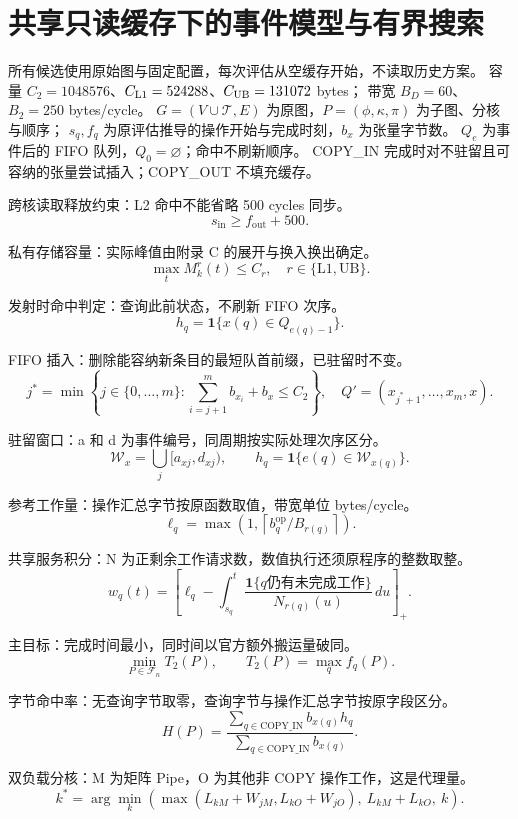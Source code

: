 \section{共享只读缓存下的事件模型与有界搜索}
所有候选使用原始图与固定配置，每次评估从空缓存开始，不读取历史方案。
容量 $C_2=1048576$、$C_{\rm L1}=524288$、$C_{\rm UB}=131072$ bytes；
带宽 $B_D=60$、$B_2=250$ bytes/cycle。
$G=(V\cup\mathcal T,E)$ 为原图，$P=(\phi,\kappa,\pi)$ 为子图、分核与顺序；
$s_q,f_q$ 为原评估推导的操作开始与完成时刻，$b_x$ 为张量字节数。
$Q_e$ 为事件后的 FIFO 队列，$Q_0=\varnothing$；命中不刷新顺序。
COPY\_IN 完成时对不驻留且可容纳的张量尝试插入；COPY\_OUT 不填充缓存。

跨核读取释放约束：L2 命中不能省略 500 cycles 同步。
\[
s_{\mathrm{in}}\ge f_{\mathrm{out}}+500. \tag{1}
\]

私有存储容量：实际峰值由附录 C 的展开与换入换出确定。
\[
\max_t M_k^r(t)\le C_r,\quad r\in\{\mathrm{L1},\mathrm{UB}\}. \tag{2}
\]

发射时命中判定：查询此前状态，不刷新 FIFO 次序。
\[
h_q=\mathbf1\{x(q)\in Q_{e(q)-1}\}. \tag{3}
\]

FIFO 插入：删除能容纳新条目的最短队首前缀，已驻留时不变。
\[
j^*=\min\left\{j\in\{0,\ldots,m\}:\sum_{i=j+1}^{m}b_{x_i}+b_x\le C_2\right\},
\quad Q'=(x_{j^*+1},\ldots,x_m,x). \tag{4}
\]

驻留窗口：a 和 d 为事件编号，同周期按实际处理次序区分。
\[
\mathcal W_x=\bigcup_j[a_{xj},d_{xj}),\qquad
h_q=\mathbf1\{e(q)\in\mathcal W_{x(q)}\}. \tag{5}
\]

参考工作量：操作汇总字节按原函数取值，带宽单位 bytes/cycle。
\[
\ell_q=\max\left(1,\left\lceil b_q^{\mathrm{op}}/B_{r(q)}\right\rceil\right).
\tag{6}
\]

共享服务积分：N 为正剩余工作请求数，数值执行还须原程序的整数取整。
\[
w_q(t)=\left[\ell_q-\int_{s_q}^{t}
\frac{\mathbf1\{q\text{仍有未完成工作}\}}{N_{r(q)}(u)}\,du\right]_+ . \tag{7}
\]

主目标：完成时间最小，同时间以官方额外搬运量破同。
\[
\min_{P\in\mathcal F_n}T_2(P),\qquad T_2(P)=\max_q f_q(P). \tag{8}
\]

字节命中率：无查询字节取零，查询字节与操作汇总字节按原字段区分。
\[
H(P)=\frac{\sum_{q\in\mathrm{COPY\_IN}}b_{x(q)}h_q}
{\sum_{q\in\mathrm{COPY\_IN}}b_{x(q)}}. \tag{9}
\]

双负载分核：M 为矩阵 Pipe，O 为其他非 COPY 操作工作，这是代理量。
\[
k^*=\arg\min_k\left(
\max(L_{kM}+W_{jM},L_{kO}+W_{jO}),\
L_{kM}+L_{kO},\ k\right). \tag{10}
\]

